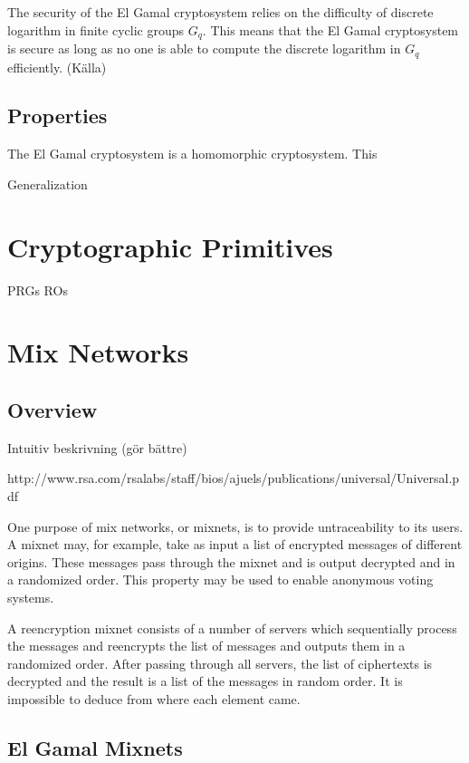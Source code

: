 \documentclass[10pt,a4paper]{article}
\begin{document}
The security of the El Gamal cryptosystem relies on the difficulty of
discrete logarithm in finite cyclic groups $G_q$. This means that the
El Gamal cryptosystem is secure as long as no one is able to compute
the discrete logarithm in $G_q$ efficiently. (Källa)

\subsection{Properties}
The El Gamal cryptosystem is a homomorphic cryptosystem. This 




Generalization

\section{Cryptographic Primitives}

PRGs
ROs

\section{Mix Networks}



\subsection{Overview}

Intuitiv beskrivning (gör bättre)

http://www.rsa.com/rsalabs/staff/bios/ajuels/publications/universal/Universal.pdf

One purpose of mix networks, or mixnets, is to provide untraceability
to its users. A mixnet may, for example, take as input a list of
encrypted messages of different origins. These messages pass through
the mixnet and is output decrypted and in a randomized order. This
property may be used to enable anonymous voting systems.

A reencryption mixnet consists of a number of servers which
sequentially process the messages and reencrypts the list of messages
and outputs them in a randomized order. After passing through all
servers, the list of ciphertexts is decrypted and the result is a list
of the messages in random order. It is impossible to deduce from where
each element came.

\subsection{El Gamal Mixnets}
\end{document}
